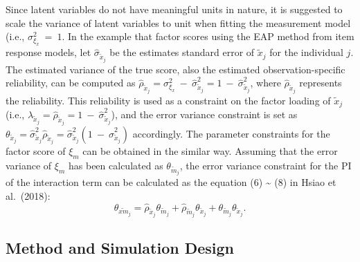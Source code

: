 \documentclass[
  man]{apa7}
\begin{document}
Since latent variables do not have meaningful units in nature, it is suggested to scale the variance of latent variables to unit when fitting the measurement model (i.e., \(\sigma_{\xi_{x}}^2 \ = \ 1\). In the example that factor scores using the EAP method from item response models, let \(\hat{\sigma}_{\tilde{x}_{j}}\) be the estimates standard error of \(\tilde{x}_{j}\) for the individual \(j\). The estimated variance of the true score, also the estimated observation-specific reliability, can be computed as \(\hat{\rho}_{\tilde{x}_{j}} = \sigma_{\xi_{x}}^2 \ - \ \hat{\sigma}_{\tilde{x}_{j}}^2 = 1 \ - \ \hat{\sigma}_{\tilde{x}_{j}}^2\), where \(\hat{\rho}_{\tilde{x}_{j}}\) represents the reliability. This reliability is used as a constraint on the factor loading of \(\tilde{x}_{j}\) (i.e., \(\lambda_{\tilde{x}_{j}} = \hat{\rho}_{\tilde{x}_{j}} = 1 \ - \ \hat{\sigma}_{\tilde{x}_{j}}^2\)), and the error variance constraint is set as \(\theta_{\tilde{x}_{j}} = \hat{\sigma}_{\tilde{x}_{j}}^2\hat{\rho}_{\tilde{x}_{j}} = \hat{\sigma}_{\tilde{x}_{j}}^2(1 \ - \ \hat{\sigma}_{\tilde{x}_{j}}^2)\) accordingly. The parameter constraints for the factor score of \(\xi_{m}\) can be obtained in the similar way. Assuming that the error variance of \(\xi_{m}\) has been calculated as \(\theta_{\tilde{m}_{j}}\), the error variance constraint for the PI of the interaction term can be calculated as the equation (6) \textasciitilde{} (8) in Hsiao et al.~(2018):
\begin{equation}
\theta_{\widetilde{xm}_{j}} =  \hat{\rho}_{\tilde{x}_{j}}\theta_{\tilde{m}_{j}} +
                        \hat{\rho}_{\tilde{m}_{j}}\theta_{\tilde{x}_{j}} +
                        \theta_{\tilde{m}_{j}}\theta_{\tilde{x}_{j}}. 
\end{equation}

\hypertarget{method-and-simulation-design}{%
\subsection{Method and Simulation Design}\label{method-and-simulation-design}}
\end{document}
